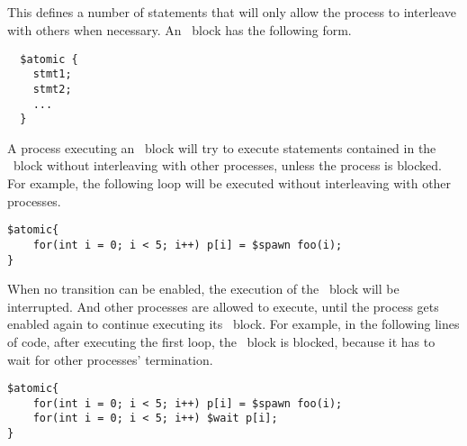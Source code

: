 \documentclass[11pt]{book}
\begin{document}
\subsection{\catomic} This defines a number of statements that will only allow the process to interleave with others when necessary. An \catomic~block has the following form.

\begin{verbatim}
  $atomic {
    stmt1;
    stmt2;
    ...
  }
\end{verbatim}

A process executing an \catomic~block will try to execute statements contained in the \catomic~block without interleaving with other processes, unless the process is blocked. For example, the following loop will be executed without interleaving with other processes.

\begin{verbatim}
$atomic{
    for(int i = 0; i < 5; i++) p[i] = $spawn foo(i);
}
\end{verbatim}


When no transition can be enabled, the execution of the \catomic~block will be interrupted. And other processes are allowed to execute, until the process gets enabled again to continue executing its \catomic~block. For example, in the following lines of code, after executing the first loop, the \catomic~block is blocked, because it has to wait for other processes' termination.
 
\begin{verbatim}  
$atomic{
    for(int i = 0; i < 5; i++) p[i] = $spawn foo(i);
    for(int i = 0; i < 5; i++) $wait p[i];
}
\end{verbatim}
\end{document}

